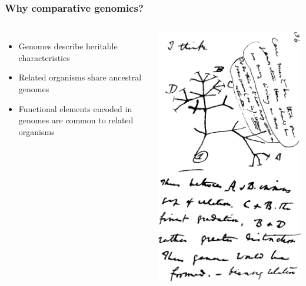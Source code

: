%
\begin{frame}
  \frametitle{Why comparative genomics?}
    \begin{columns}[c] 
        \begin{itemize}
         \item \textcolor{hutton_green}{Genomes describe heritable characteristics}
         \item Related organisms share ancestral genomes
         \item \textcolor{hutton_blue}{Functional elements encoded in genomes are common to related organisms}
        \end{itemize}
        \includegraphics[width=\textwidth]{images/darwin_tree}
    \end{columns}  
\end{frame}

